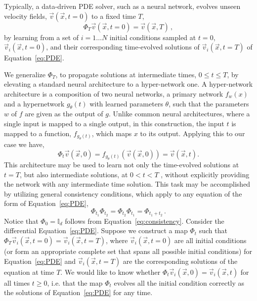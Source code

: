 \documentclass{article}
\theoremstyle{plain}
\theoremstyle{definition}
\theoremstyle{remark}
\begin{document}
Typically, a data-driven PDE solver, such as a neural network, evolves unseen velocity fields, $\vec{v}(\vec{x}, t=0)$ to a fixed time $T$,
\begin{equation}
    \Phi_T \vec{v}\left(\vec{x},t=0\right) = \vec{v}\left(\vec{x},T\right) \,,
\end{equation}
by learning from a set of $i=1\dots N$ initial conditions sampled at $t=0$, $\vec{v}_i\left(\vec{x},t=0\right)$, and their corresponding time-evolved solutions of $\vec{v}_i\left(\vec{x},t=T\right)$ of Equation~\eqref{eq:PDE}. 

We generalize $\Phi_T$, to propagate solutions at intermediate times, $0 \leq t \leq T$, by elevating a standard neural architecture to a hyper-network one. A hyper-network architecture is a composition of two neural networks, a primary network $f_w(x)$ and a hypernetwork $g_\theta(t)$ with learned parameters $\theta$, such that the parameters $w$ of $f$ are given as the output of $g$. Unlike common neural architectures, where a single input is mapped to a single output, in this construction, the input $t$ is mapped to a function, $f_{g_\theta(t)}$, which maps $x$ to its output. Applying this to our case we have,
\begin{equation}
\Phi_t \vec{v}(\vec{x},0) =f_{g_\theta(t)}(\vec{v}(\vec{x},0)) = \vec{v}(\vec{x},t).
\label{eq:hyper}
\end{equation}
This architecture may be used to learn not only the time-evolved solutions at $t=T$, but also intermediate solutions, at $0 < t < T$ , without explicitly providing the network with any intermediate time solution.
This task may be accomplished by utilizing general consistency conditions, which apply to any equation of the form of Equation~\eqref{eq:PDE}, 
\begin{equation}
\Phi_{t_1}\Phi_{t_2} =  \Phi_{t_2}\Phi_{t_1} = \Phi_{t_1+t_2} \,. 
\label{eq:consistency}
\end{equation}
Notice that $\Phi_0 = {\mathbb I}_d$ follows from Equation~\eqref{eq:consistency}. 
Consider the differential Equation~\eqref{eq:PDE}. Suppose we construct a map $\Phi_t$ 
such that $\Phi_T \vec{v}_i\left(\vec{x},t=0\right) = \vec{v}_i\left(\vec{x},t=T\right)$, where $\vec{v}_i\left(\vec{x},t=0\right)$ are all initial conditions (or form an appropriate complete set that spans all possible initial conditions)
for Equation~\eqref{eq:PDE} and $\vec{v}_i\left(\vec{x},t=T\right)$ are the corresponding solutions of the equation
at time $T$. We would like to know whether $\Phi_t \vec{v}_i\left(\vec{x},0\right) = \vec{v}_i\left(\vec{x},t\right)$ for all times $t\geq 0$, i.e. that the map $\Phi_t$ evolves all the initial condition
correctly as the solutions of Equation~\eqref{eq:PDE} for any time.
\end{document}
